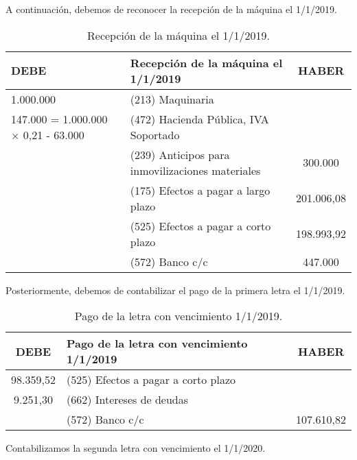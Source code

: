 A continuación, debemos de reconocer la recepción de la máquina el 1/1/2019.

\begin{table}[H]
    \centering
    \begin{tabular}{|p{2cm}|p{8cm}|c|}
        \hline
        \rowcolor{blue!30}
        \textbf{DEBE} & \textbf{Recepción de la máquina el 1/1/2019} & \textbf{HABER} \\
        \hline
        1.000.000 & (213) Maquinaria & \\
        \hline
        147.000 = 1.000.000 $\times$ 0,21 - 63.000& (472) Hacienda Pública, IVA Soportado & \\
        \hline
        & (239) Anticipos para inmovilizaciones materiales & 300.000 \\
        \hline
        & (175) Efectos a pagar a largo plazo & 201.006,08 \\
        \hline
        & (525) Efectos a pagar a corto plazo & 198.993,92 \\
        \hline
        & (572) Banco c/c & 447.000 \\
        \hline
    \end{tabular}
    \caption{Recepción de la máquina el 1/1/2019.}
    \label{tabla:recepcion_maquina}
\end{table}

Posteriormente, debemos de contabilizar el pago de la primera letra el 1/1/2019.

\begin{table}[H]
    \centering
    \begin{tabular}{|c|p{8cm}|c|}
        \hline
        \rowcolor{blue!30}
        \textbf{DEBE} & \textbf{Pago de la letra con vencimiento 1/1/2019} & \textbf{HABER} \\
        \hline
        98.359,52 & (525) Efectos a pagar a corto plazo & \\
        \hline
        9.251,30 & (662) Intereses de deudas & \\
        \hline
        & (572) Banco c/c & 107.610,82 \\
        \hline
    \end{tabular}
    \caption{Pago de la letra con vencimiento 1/1/2019.}
    \label{tabla:pago_letra_2019}
\end{table}

Contabilizamos la segunda letra con vencimiento el 1/1/2020.


